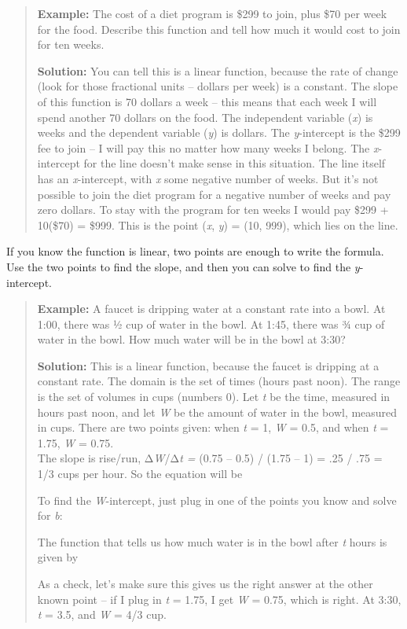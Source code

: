 \begin{quote}
\textbf{Example:} The cost of a diet program is \$299 to join, plus \$70
per week for the food. Describe this function and tell how much it would
cost to join for ten weeks.

\textbf{Solution:} You can tell this is a linear function, because the
rate of change (look for those fractional units -- dollars per week) is
a constant. The slope of this function is 70 dollars a week -- this
means that each week I will spend another 70 dollars on the food. The
independent variable (\emph{x}) is weeks and the dependent variable
(\emph{y}) is dollars. The \emph{y}-intercept is the \$299 fee to join
-- I will pay this no matter how many weeks I belong. The
\emph{x}-intercept for the line doesn't make sense in this situation.
The line itself has an \emph{x}-intercept, with \emph{x} some negative
number of weeks. But it's not possible to join the diet program for a
negative number of weeks and pay zero dollars. To stay with the program
for ten weeks I would pay \$299 + 10(\$70) = \$999. This is the point
(\emph{x}, \emph{y}) = (10, 999), which lies on the line.
\end{quote}

If you know the function is linear, two points are enough to write the
formula. Use the two points to find the slope, and then you can solve to
find the \emph{y}-intercept.

\begin{quote}
\textbf{Example:} A faucet is dripping water at a constant rate into a
bowl. At 1:00, there was ½ cup of water in the bowl. At 1:45, there was
¾ cup of water in the bowl. How much water will be in the bowl at 3:30?

\textbf{Solution:} This is a linear function, because the faucet is
dripping at a constant rate. The domain is the set of times (hours past
noon). The range is the set of volumes in cups (numbers 0). Let \emph{t}
be the time, measured in hours past noon, and let \emph{W} be the amount
of water in the bowl, measured in cups. There are two points given: when
\emph{t} = 1, \emph{W} = 0.5, and when \emph{t} = 1.75, \emph{W} =
0.75.\\
The slope is rise/run, Δ\emph{W}/Δ\emph{t =} (0.75 -- 0.5) / (1.75 -- 1)
= .25 / .75 = 1/3 cups per hour. So the equation will be

To find the \emph{W}-intercept, just plug in one of the points you know
and solve for \emph{b}:

The function that tells us how much water is in the bowl after \emph{t}
hours is given by

As a check, let's make sure this gives us the right answer at the other
known point -- if I plug in \emph{t} = 1.75, I get \emph{W} = 0.75,
which is right. At 3:30, \emph{t} = 3.5, and \emph{W} = 4/3 cup.
\end{quote}

